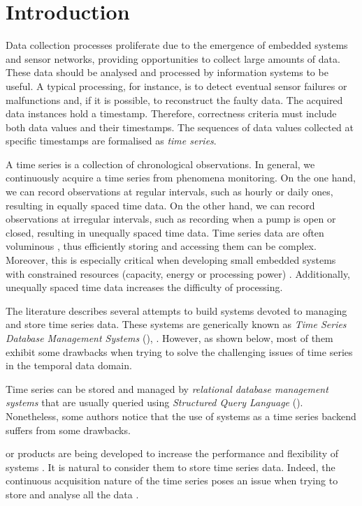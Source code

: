\section{Introduction}

Data collection processes proliferate due to the emergence of embedded
systems and sensor networks, providing opportunities to collect large
amounts of data.  These data should be analysed and processed by
information systems to be useful. A typical processing, for instance,
is to detect eventual sensor failures or malfunctions and, if it is
possible, to reconstruct the faulty data. The acquired data instances
hold a timestamp. Therefore, correctness criteria must include both
data values and their timestamps. The sequences of data values
collected at specific timestamps are formalised as \emph{time series}.

A time series is a collection of chronological observations.  In
general, we continuously acquire a time series from phenomena
monitoring. On the one hand, we can record observations at regular
intervals, such as hourly or daily ones, resulting in equally spaced
time data.  On the other hand, we can record observations at irregular
intervals, such as recording when a pump is open or closed, resulting
in unequally spaced time data. Time series data are often voluminous
\cite{fu11,keogh08:isax}, thus efficiently storing and accessing them
can be complex. Moreover, this is especially critical when developing
small embedded systems with constrained resources (capacity, energy or
processing power) \cite{yaogehrke02}. Additionally, unequally spaced
time data increases the difficulty of processing.

The literature describes several attempts to build systems devoted to
managing and store time series data. These systems are generically
known as \emph{Time Series Database Management Systems}
(), \cite{dreyer94,last01}. However, as shown below, most
of them exhibit some drawbacks when trying to solve the challenging
issues of time series in the temporal data domain.

Time series can be stored and managed by \emph{relational database
  management systems} that are usually queried using \emph{Structured
  Query Language} (). Nonetheless, some authors
\cite{dreyer94,schmidt95,stonebraker09:scidb,zhang11} notice that the
use of  systems as a time series backend suffers from some
drawbacks.

 or  products are being developed to
increase the performance and flexibility of  systems
\cite{atzeni13:relational_model_dead,stonebraker10,stonebraker09:scidb,zhang11}. It
is natural to consider them to store time series data. Indeed, the
continuous acquisition nature of the time series poses an issue when
trying to store and analyse all the data \cite{keogh97}.

